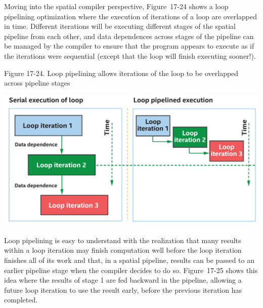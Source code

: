 Moving into the spatial compiler perspective, Figure 17-24 shows a loop pipelining optimization where the execution of iterations of a loop are overlapped in time. Different iterations will be executing different stages of the spatial pipeline from each other, and data dependences across stages of the pipeline can be managed by the compiler to ensure that the program appears to execute as if the iterations were sequential (except that the loop will finish executing sooner!).\par

\hspace*{\fill} \par %
Figure 17-24. Loop pipelining allows iterations of the loop to be overlapped across pipeline stages
\begin{center}
	\includegraphics[width=1.0\textwidth]{content/chapter-17/images/19}
\end{center}

Loop pipelining is easy to understand with the realization that many results within a loop iteration may finish computation well before the loop iteration finishes all of its work and that, in a spatial pipeline, results can be passed to an earlier pipeline stage when the compiler decides to do so. Figure 17-25 shows this idea where the results of stage 1 are fed backward in the pipeline, allowing a future loop iteration to use the result early, before the previous iteration has completed.\par

